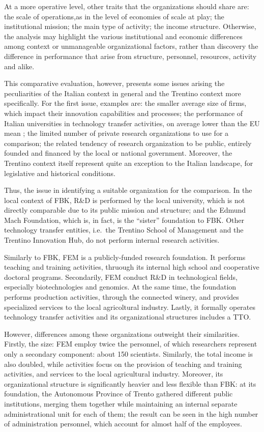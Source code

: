 At a more operative level, other traits that the organizations should share are: the scale of operations,as in the level of economies of scale at play; the institutional mission; the main type of activity; the income structure. Otherwise, the analysis may highlight the various institutional and economic differences among context or unmanageable organizational factors, rather than discovery the difference in performance that arise from structure, personnel, resources, activity and alike.

This comparative evaluation, however, presents some issues arising the peculiarities of the Italian context in general and the Trentino context more specifically. For the first issue, examples are: the smaller average size of firms, which impact their innovation capabilities and processes; the performance of Italian universities in technology transfer activities, on average lower than the EU mean \citep{Balderi2007}; the limited number of private research organizations to use for a comparison; the related tendency of research organization to be public, entirely founded and financed by the local or national government. Moreover, the Trentino context itself  represent quite an exception to the Italian landscape, for legislative and historical conditions. 

Thus, the issue in identifying a suitable organization for the comparison. In the local context of FBK, R\&D is performed by the local university, which is not directly comparable due to its public mission and structure; and the Edmund Mach Foundation, which is, in fact, is the \enquote{sister} foundation to FBK. Other technology transfer entities, i.e.\ the Trentino School of Management and the Trentino Innovation Hub, do not perform internal research activities.

Similarly to FBK, FEM is a publicly-funded research foundation. It performs teaching and training activities, thruough its internal high school and cooperative doctoral programs. Secondarily, FEM conduct R\&D in technological fields, especially  biotechnologies and genomics. At the same time, the foundation performs production activities, through the connected winery, and provides specialized services to the local agricoltural industry. Lastly, it formally operates technology transfer activities and its organizational structures includes a TTO.

However, differences among these organizations outweight their similarities. Firstly, the size: FEM employ twice the  personnel, of which researchers represent only a secondary component: about 150 scientists. Similarly, the total income is also doubled, while activities focus on the provision of teaching and training activities, and services to the local agricultural industry. Moreover, its organizational structure is significantly heavier and less flexible than FBK: at its foundation, the Autonomous Province of Trento gathered different public institutions, merging them together while maintaining an internal separate administrational unit for each of them; the result can be seen in the high number of administration personnel, which account for almost half of the employees. 

